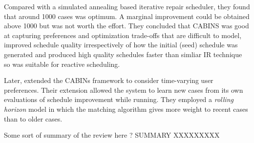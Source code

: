 Compared with a simulated annealing based iterative repair scheduler, they found that around 1000 cases was optimum. A marginal improvement could be obtained above 1000 but was not worth the effort. They concluded that CABINS was good at capturing preferences and optimization trade-offs that are difficult to model, improved schedule quality irrespectively of how the initial (seed) schedule was generated and produced high quality schedules faster than simliar IR technique so was suitable for reactive scheduling.



Later, \citet{sycara96case} extended the CABINs framework to consider time-varying user preferences. Their extension allowed the system to learn new cases from its own evaluations of schedule improvement while running. They employed a \emph{rolling horizon} model in which the matching algorithm gives more weight to recent cases than to older cases.



%
%


%
%


Some sort of summary of the review here ?
SUMMARY XXXXXXXXX
